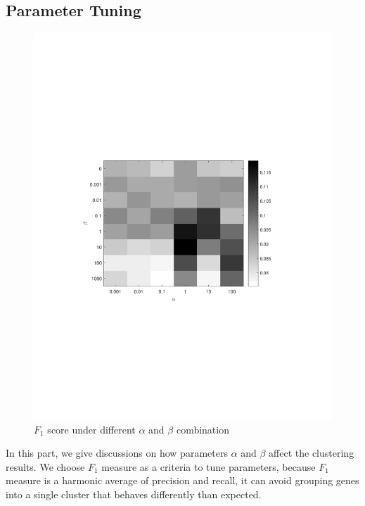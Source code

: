\documentclass{bmcart}
\begin{document}
\subsection*{\textbf{Parameter Tuning}}
\begin{figure}[!h]
  \begin{minipage}[t]{0.7\linewidth}
    \includegraphics[width=\linewidth,origin = l]{DrawPictures/alpha-gama.pdf}
  \end{minipage}
  \caption{$F_1$ score under different $\alpha$ and $\beta$ combination}
  \label{fig:alpha_gamma}
\end{figure}

In this part, we give discussions on how parameters $\alpha$ and $\beta$ affect the clustering results. We choose $F_1$ measure as a criteria to tune parameters, because $F_1$ measure is a  harmonic average of precision and recall, it can avoid grouping genes into a single cluster that behaves differently than expected.
\end{document}
